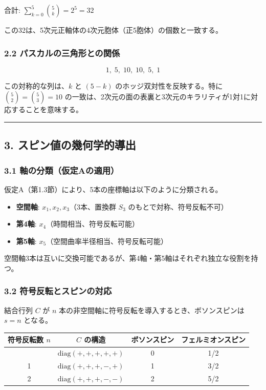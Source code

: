 \documentclass[a4paper,11pt]{ltjsarticle}
\providecommand{\tightlist}{\setlength{\itemsep}{0pt}\setlength{\parskip}{0pt}}
\newcounter{none}
\begin{document}
合計: $\sum_{k=0}^{5} \binom{5}{k} = 2^5 = 32$

この32は、5次元正軸体の4次元胞体（正5胞体）の個数と一致する。

\subsubsection*{2.2 パスカルの三角形との関係}

\[1, \; 5, \; 10, \; 10, \; 5, \; 1\]

この対称的な列は、$k$ と $(5-k)$ のホッジ双対性を反映する。特に
$\binom{5}{2} = \binom{5}{3} = 10$
の一致は、2次元の面の表裏と3次元のキラリティが1対1に対応することを意味する。

\begin{center}\rule{0.5\linewidth}{0.5pt}\end{center}

\subsection*{3. スピン値の幾何学的導出}

\subsubsection*{3.1 軸の分類（仮定Aの適用）}

仮定A（第1.3節）により、5本の座標軸は以下のように分類される。

\begin{itemize}
\tightlist
\item
  \textbf{空間軸}: $x_1, x_2, x_3$（3本、置換群 $S_3$ のもとで対称、符号反転不可）
\item
  \textbf{第4軸}: $x_4$（時間相当、符号反転可能）
\item
  \textbf{第5軸}: $x_5$（空間曲率半径相当、符号反転可能）
\end{itemize}

空間軸3本は互いに交換可能であるが、第4軸・第5軸はそれぞれ独立な役割を持つ。

\subsubsection*{3.2 符号反転とスピンの対応}

結合行列 $C$ が $n$
本の非空間軸に符号反転を導入するとき、ボソンスピンは $s = n$ となる。

{\def\LTcaptype{none}
\begin{longtable}[]{@{}cccc@{}}
\toprule
符号反転数 $n$ & $C$ の構造 & ボソンスピン & フェルミオンスピン \\
\midrule
\endhead
\bottomrule
\endlastfoot
0 & $\mathrm{diag}(+,+,+,+,+)$ & 0 & 1/2 \\
1 & $\mathrm{diag}(+,+,+,-,+)$ & 1 & 3/2 \\
2 & $\mathrm{diag}(+,+,+,-,-)$ & 2 & 5/2 \\
\end{longtable}
}
\end{document}
